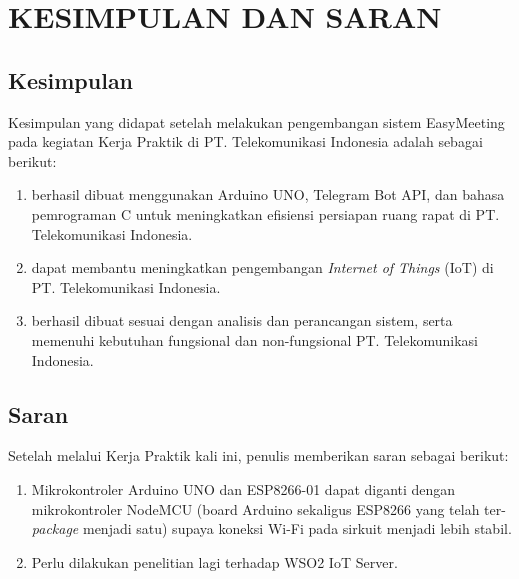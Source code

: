 \chapter{KESIMPULAN DAN SARAN}

\section{Kesimpulan}
\tab Kesimpulan yang didapat setelah melakukan pengembangan sistem EasyMeeting pada kegiatan Kerja Praktik di PT. Telekomunikasi Indonesia adalah sebagai berikut:
\begin{enumerate}
\item \sistem berhasil dibuat menggunakan Arduino UNO, Telegram Bot API, dan bahasa pemrograman C untuk meningkatkan efisiensi persiapan ruang rapat di PT. Telekomunikasi Indonesia.
\item \sistem dapat membantu meningkatkan pengembangan \textit{Internet of Things} (IoT) di PT. Telekomunikasi Indonesia.
\item \sistem berhasil dibuat sesuai dengan analisis dan perancangan sistem, serta memenuhi kebutuhan fungsional dan non-fungsional PT. Telekomunikasi Indonesia.
\end{enumerate}

\section{Saran}
Setelah melalui Kerja Praktik kali ini, penulis memberikan saran sebagai berikut:
\begin{enumerate}
\item Mikrokontroler Arduino UNO dan ESP8266-01 dapat diganti dengan mikrokontroler NodeMCU (board Arduino sekaligus ESP8266 yang telah ter-\textit{package} menjadi satu) supaya koneksi Wi-Fi pada sirkuit menjadi lebih stabil.
\item Perlu dilakukan penelitian lagi terhadap WSO2 IoT Server.
\end{enumerate}